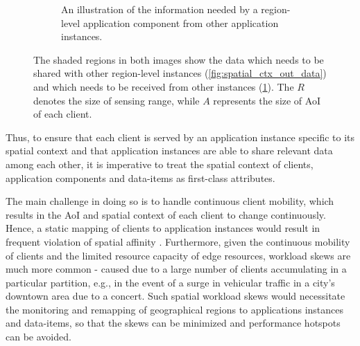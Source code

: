 \begin{figure}
\begin{subfigure}{0.4\textwidth}
  \caption{An illustration of the information needed by a region-level application component from other application instances. }
  \label{fig:spatial_ctx_in_data}
\end{subfigure}
\caption{The shaded regions in both images show the data which needs to be shared with other region-level instances (\cref{fig:spatial_ctx_out_data}) and which needs to be received from other instances (\cref{fig:spatial_ctx_in_data}). The $R$ denotes the size of sensing range, while $A$ represents the size of AoI of each client. }
\label{fig:spatial_data_sharing}
\end{figure}
Thus, to ensure that each client is served by an application instance specific to its spatial context and that application instances are able to share relevant data among each other, it is imperative to treat the spatial context of clients, application components and data-items as first-class attributes. 
\par The main challenge in doing so is to handle continuous client mobility, which results in the AoI and spatial context of each client to change continuously. Hence, a static mapping of clients to application instances would result in frequent violation of spatial affinity . Furthermore, given the continuous mobility of clients and the limited resource capacity of edge resources, workload skews are much more common - caused due to a large number of clients accumulating in a particular partition, e.g., in the event of a surge in vehicular traffic in a city's downtown area due to a concert. Such spatial workload skews would necessitate the monitoring and remapping of geographical regions to applications instances and data-items, so that the skews can be minimized and performance hotspots can be avoided.

